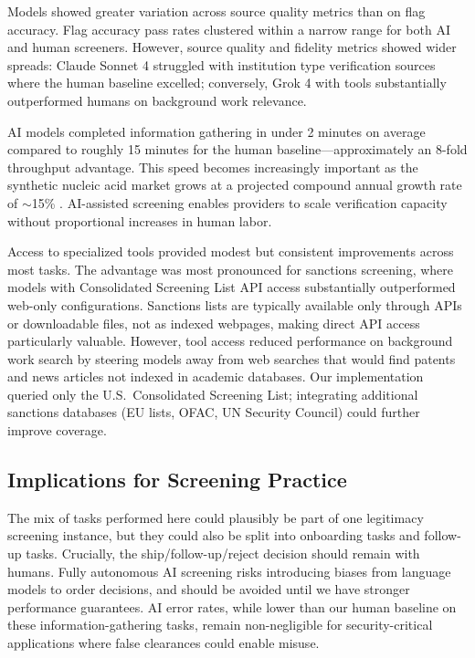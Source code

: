 \documentclass[utf8]{FrontiersinHarvard}
\begin{document}
Models showed greater variation across source quality metrics than on flag accuracy. Flag accuracy pass rates clustered within a narrow range for both AI and human screeners. However, source quality and fidelity metrics showed wider spreads: Claude Sonnet 4 struggled with institution type verification sources where the human baseline excelled; conversely, Grok 4 with tools substantially outperformed humans on background work relevance.

AI models completed information gathering in under 2 minutes on average compared to roughly 15 minutes for the human baseline---approximately an 8-fold throughput advantage. This speed becomes increasingly important as the synthetic nucleic acid market grows at a projected compound annual growth rate of ${\sim}$15\% \citep{Fady2025report}. AI-assisted screening enables providers to scale verification capacity without proportional increases in human labor.

Access to specialized tools provided modest but consistent improvements across most tasks. The advantage was most pronounced for sanctions screening, where models with Consolidated Screening List API access substantially outperformed web-only configurations. Sanctions lists are typically available only through APIs or downloadable files, not as indexed webpages, making direct API access particularly valuable. However, tool access reduced performance on background work search by steering models away from web searches that would find patents and news articles not indexed in academic databases. Our implementation queried only the U.S.\ Consolidated Screening List; integrating additional sanctions databases (EU lists, OFAC, UN Security Council) could further improve coverage.

\subsection{Implications for Screening Practice}

The mix of tasks performed here could plausibly be part of one legitimacy screening instance, but they could also be split into onboarding tasks and follow-up tasks. Crucially, the ship/follow-up/reject decision should remain with humans. Fully autonomous AI screening risks introducing biases from language models to order decisions, and should be avoided until we have stronger performance guarantees. AI error rates, while lower than our human baseline on these information-gathering tasks, remain non-negligible for security-critical applications where false clearances could enable misuse.
\end{document}
